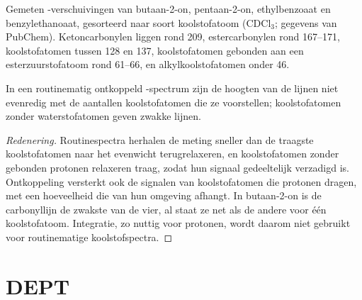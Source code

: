 \begin{omfigure}

{\small Gemeten -verschuivingen van butaan-2-on, pentaan-2-on, ethylbenzoaat en benzylethanoaat,
gesorteerd naar soort koolstofatoom (CDCl$_3$; gegevens van PubChem). Ketoncarbonylen liggen rond 209, estercarbonylen rond
167--171,  koolstofatomen tussen 128 en 137, koolstofatomen gebonden aan een esterzuurstofatoom rond 61--66, en
alkylkoolstofatomen onder 46.}
\end{omfigure}

\begin{proposition}\label{prop:b2:structure-determination:intensities}
In een routinematig ontkoppeld -spectrum zijn de hoogten van de lijnen niet evenredig met de
aantallen koolstofatomen die ze voorstellen; koolstofatomen zonder waterstofatomen geven zwakke lijnen.
\end{proposition}

\begin{proof}[Redenering]
Routinespectra herhalen de meting sneller dan de traagste koolstofatomen naar het evenwicht terugrelaxeren, en
koolstofatomen zonder gebonden protonen relaxeren traag, zodat hun signaal gedeeltelijk verzadigd is. Ontkoppeling
versterkt ook de signalen van koolstofatomen die protonen dragen, met een hoeveelheid die van hun omgeving afhangt.
In butaan-2-on is de carbonyllijn de zwakste van de vier, al staat ze net als de andere voor één koolstofatoom.
Integratie, zo nuttig voor protonen, wordt daarom niet gebruikt voor routinematige koolstofspectra.
\end{proof}

\section{DEPT}

